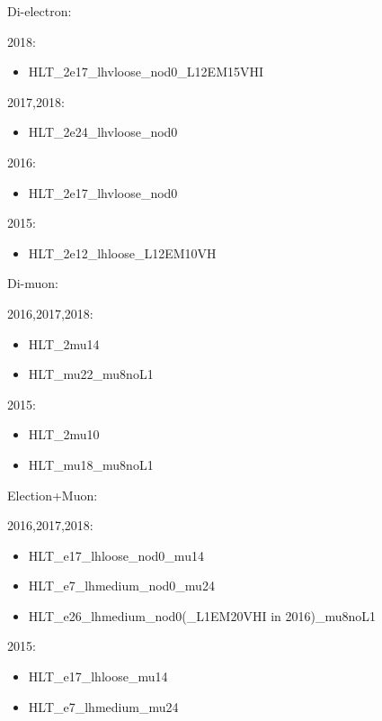 Di-electron:

2018:
\begin{itemize}
	\item HLT\_2e17\_lhvloose\_nod0\_L12EM15VHI
\end{itemize}
2017,2018:
\begin{itemize}
	\item HLT\_2e24\_lhvloose\_nod0
\end{itemize}
2016:
\begin{itemize}
	\item HLT\_2e17\_lhvloose\_nod0
\end{itemize}
2015:
\begin{itemize}
	\item HLT\_2e12\_lhloose\_L12EM10VH
\end{itemize}

Di-muon:

2016,2017,2018:
\begin{itemize}
	\item HLT\_2mu14
	\item HLT\_mu22\_mu8noL1
\end{itemize}
2015:
\begin{itemize}
	\item HLT\_2mu10
	\item HLT\_mu18\_mu8noL1
\end{itemize}

Election+Muon:

2016,2017,2018:
\begin{itemize}
	\item HLT\_e17\_lhloose\_nod0\_mu14
	\item HLT\_e7\_lhmedium\_nod0\_mu24
	\item HLT\_e26\_lhmedium\_nod0(\_L1EM20VHI in 2016)\_mu8noL1
\end{itemize}
2015:
\begin{itemize}
	\item HLT\_e17\_lhloose\_mu14
	\item HLT\_e7\_lhmedium\_mu24
\end{itemize}
%  
%  
%  
%  

